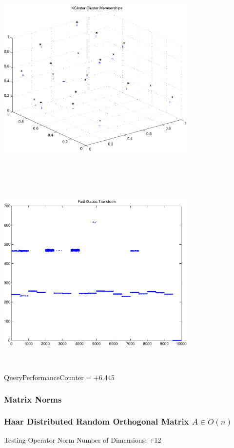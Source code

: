 \documentclass[9pt]{article}
\theoremstyle{plain}
\theoremstyle{definition}
\theoremstyle{remark}
\numberwithin{equation}{section}
\begin{document}
\includegraphics[width=10.0cm,height=10.0cm]{KCenterClusterMemberships_20_Centers.pdf}

\includegraphics[width=10.0cm,height=10.0cm]{FGT20_Centers.pdf}

QueryPerformanceCounter  =  +6.445
\subsubsection{Matrix Norms}
\subsubsection{Haar Distributed Random Orthogonal Matrix $A \in O(n)$}
 Testing Operator Norm
Number of Dimensions: +12
\end{document}
